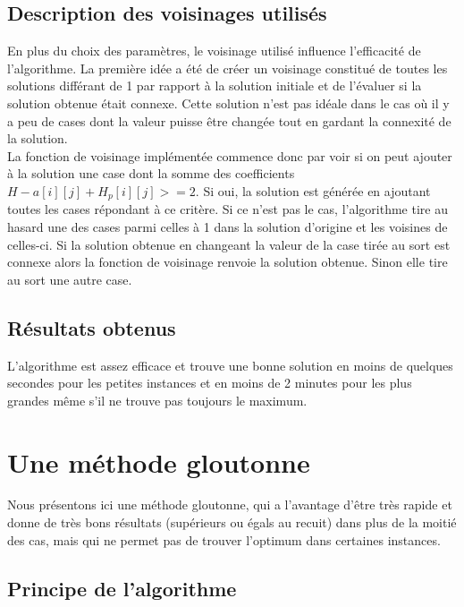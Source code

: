 \documentclass[12pt,a4paper]{article}
\begin{document}
\subsection{Description des voisinages utilisés}
En plus du choix des paramètres, le voisinage utilisé influence l'efficacité de l'algorithme. La première idée a été de créer un voisinage constitué de toutes les solutions différant de 1 par rapport à la solution initiale et de l'évaluer si la solution obtenue était connexe. Cette solution n'est pas idéale dans le cas où il y a peu de cases dont la valeur puisse être changée tout en gardant la connexité de la solution.\\
La fonction de voisinage implémentée commence donc par voir si on peut ajouter à la solution une case dont la somme des coefficients $H-a[i][j]+H_p[i][j]>=2$. Si oui, la solution est générée en ajoutant toutes les cases répondant à ce critère. Si ce n'est pas le cas, l'algorithme tire au hasard une des cases parmi celles à 1 dans la solution d'origine et les voisines de celles-ci. Si la solution obtenue en changeant la valeur de la case tirée au sort est connexe alors la fonction de voisinage renvoie la solution obtenue. Sinon elle tire au sort une autre case.

\subsection{Résultats obtenus}
L'algorithme est assez efficace et trouve une bonne solution en moins de quelques secondes pour les petites instances et en moins de 2 minutes pour les plus grandes même s'il ne trouve pas toujours le maximum.\\



\vspace{1cm}

\section{Une méthode gloutonne}

Nous présentons ici une méthode gloutonne, qui a l'avantage d'être très rapide et donne de très bons résultats (supérieurs ou égals au recuit) dans plus de la moitié des cas, mais qui ne permet pas de trouver l'optimum dans certaines instances.

\subsection{Principe de l'algorithme}
\end{document}
